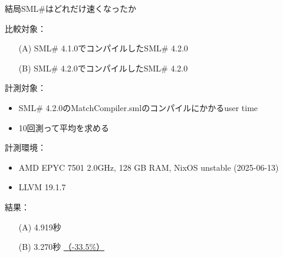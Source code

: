 \documentclass[aspectratio=169,t,dvipdfmx,12pt]{beamer}
\newcommand\focus[1]{{\color{focus}\underline{#1}}}
\newcommand\smlsharp{SML\#}
\newcommand\PART[1]{%
  \begin{frame}
  \vfill\hfil\structure{\Large\bfseries #1}
  \end{frame}}
\begin{document}
\PART{評価とまとめ}

\begin{frame}{結局\smlsharp{}はどれだけ速くなったか}

比較対象：
\begin{enumerate}
\item[(A)] \smlsharp{} 4.1.0でコンパイルした\smlsharp{} 4.2.0
\item[(B)] \smlsharp{} 4.2.0でコンパイルした\smlsharp{} 4.2.0
\end{enumerate}

\bigskip

計測対象：
\begin{itemize}
\item \smlsharp{} 4.2.0のMatchCompiler.smlのコンパイルにかかるuser time
\item 10回測って平均を求める
\end{itemize}

\bigskip

計測環境：
\begin{itemize}
\item AMD EPYC 7501 2.0GHz, 128 GB RAM, NixOS unstable (2025-06-13)
\item LLVM 19.1.7
\end{itemize}

\bigskip

結果：
\begin{enumerate}
\item[(A)] 4.919秒
\item[(B)] 3.270秒 \focus{（-33.5\%）}


\end{enumerate}

\end{frame}
\end{document}
